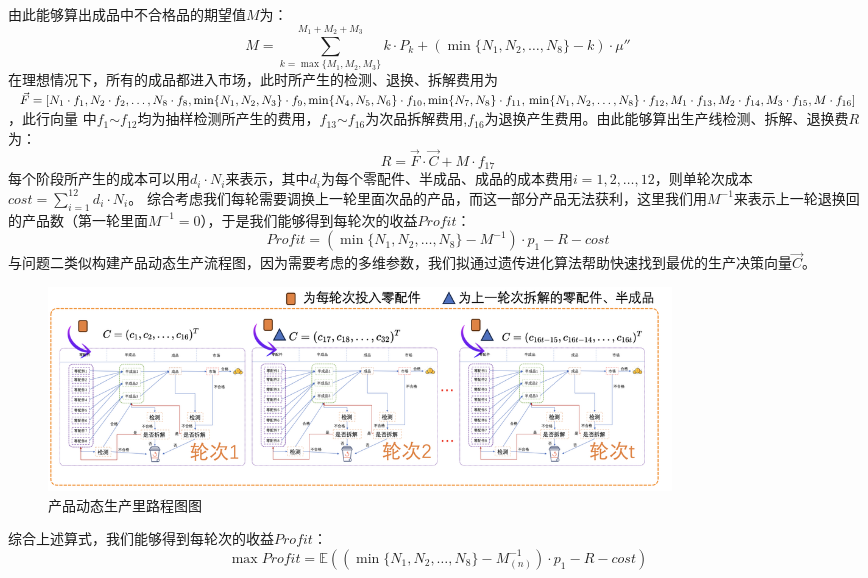\documentclass[withoutpreface,bwprint]{cumcmthesis} %
\begin{document}
由此能够算出成品中不合格品的期望值$M$为：
\begin{equation}
	M=\sum_{k=\max \{M_{1},M_{2},M_{3}\}}^{M_{1}+M_{2}+M_{3}}k\cdot P_{k}+(\min \{N_{1},N_{2},\dots,N_{8}\}-k)\cdot \mu''
	\label{eq:10}
\end{equation}
在理想情况下，所有的成品都进入市场，此时所产生的检测、退换、拆解费用为$\vec{F}=[N_{1}\cdot f_{1},N_{2}\cdot f_{2},\dots,N_{8}\cdot f_{8},
	\min \{ N_{1},N_{2},N_{3}\}\cdot f_{9},\min \{ N_{4},N_{5},N_{6}\}\cdot f_{10},\min \{ N_{7},N_{8}\}\cdot f_{11},\\
	\min \{N_{1},N_{2},\dots,N_{8}\}\cdot f_{12},M_{1}\cdot f_{13},M_{2}\cdot f_{14},M_{3}\cdot f_{15},M\cdot f_{16}]$，此行向量
中$f_{1}$$\sim$$f_{12}$均为抽样检测所产生的费用，$f_{13}$$\sim$$f_{16}$为次品拆解费用,$f_{16}$为退换产生费用。由此能够算出生产线检测、拆解、退换费$R$为：
\begin{equation}
	R=\vec{F}\cdot \vec{C} + M\cdot f_{17}
	\label{eq:11}
\end{equation}
每个阶段所产生的成本可以用$d_{i}\cdot N_{i}$来表示，其中$d_{i}$为每个零配件、半成品、成品的成本费用$i=1,2,\dots,12$，则单轮次成本$cost = \sum_{i=1}^{12}d_{i}\cdot N_{i}$。
综合考虑我们每轮需要调换上一轮里面次品的产品，而这一部分产品无法获利，这里我们用$M^{-1}$来表示上一轮退换回的产品数（第一轮里面$M^{-1}=0$），于是我们能够得到每轮次的收益$Profit$：
\begin{equation}
	\textit{Profit}=(\min \{N_{1},N_{2},\dots,N_{8}\}-M^{-1})\cdot p_{1}-R-cost
	\label{eq:12}
\end{equation}
与问题二类似构建产品动态生产流程图，因为需要考虑的多维参数，我们拟通过遗传进化算法\cite{GA}帮助快速找到最优的生产决策向量$\vec{C}$。
\begin{figure}[H]
	\centering
	\includegraphics[width=0.8\textwidth]{Fig/pro3-2.png}
	\caption{产品动态生产里路程图图}
	\label{fig:pro3-2}
\end{figure}
综合上述算式，我们能够得到每轮次的收益$Profit$：
$$\max	\textit{Profit}=\mathbb{E}((\min \{N_{1},N_{2},\dots,N_{8}\}-M_{(n)}^{-1})\cdot p_{1}-R-cost)$$
\end{document}
